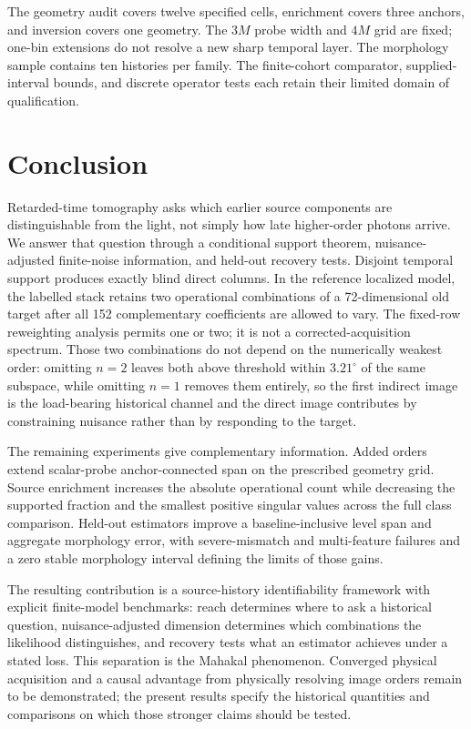 The geometry audit covers twelve specified cells, enrichment covers three anchors, and inversion covers one geometry. The $3M$ probe width and $4M$ grid are fixed; one-bin extensions do not resolve a new sharp temporal layer. The morphology sample contains ten histories per family. The finite-cohort comparator, supplied-interval bounds, and discrete operator tests each retain their limited domain of qualification.

\section{Conclusion}
Retarded-time tomography asks which earlier source components are distinguishable from the light, not simply how late higher-order photons arrive. We answer that question through a conditional support theorem, nuisance-adjusted finite-noise information, and held-out recovery tests. Disjoint temporal support produces exactly blind direct columns. In the reference localized model, the labelled stack retains two operational combinations of a 72-dimensional old target after all 152 complementary coefficients are allowed to vary. The fixed-row reweighting analysis permits one or two; it is not a corrected-acquisition spectrum. Those two combinations do not depend on the numerically weakest order: omitting $n=2$ leaves both above threshold within $3.21^\circ$ of the same subspace, while omitting $n=1$ removes them entirely, so the first indirect image is the load-bearing historical channel and the direct image contributes by constraining nuisance rather than by responding to the target.

The remaining experiments give complementary information. Added orders extend scalar-probe anchor-connected span on the prescribed geometry grid. Source enrichment increases the absolute operational count while decreasing the supported fraction and the smallest positive singular values across the full class comparison. Held-out estimators improve a baseline-inclusive level span and aggregate morphology error, with severe-mismatch and multi-feature failures and a zero stable morphology interval defining the limits of those gains.

The resulting contribution is a source-history identifiability framework with explicit finite-model benchmarks: reach determines where to ask a historical question, nuisance-adjusted dimension determines which combinations the likelihood distinguishes, and recovery tests what an estimator achieves under a stated loss. This separation is the Mahakal phenomenon. Converged physical acquisition and a causal advantage from physically resolving image orders remain to be demonstrated; the present results specify the historical quantities and comparisons on which those stronger claims should be tested.

